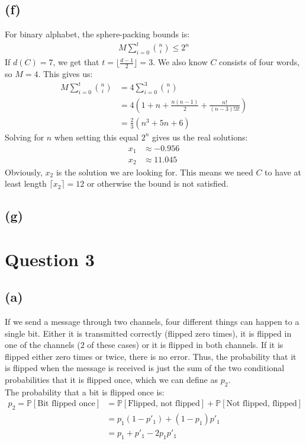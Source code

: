 \documentclass[a4paper, fleqn]{article}
\begin{document}
\subsection{(f)}
For binary alphabet, the sphere-packing bounds is:
\begin{align*}
  M\sum_{i=0}^t \binom{n}{i}\leq 2^n
\end{align*}
If $d(C)=7$, we get that $t=\lfloor \frac{d-1}{2} \rfloor = 3$. We also know $C$ consists
of four words, so $M=4$. This gives us:
\begin{align*}
  M\sum_{i=0}^t \binom{n}{i}&= 4\sum_{i=0}^3 \binom{n}{i} \\
                            &= 4\left(1+n+\frac{n(n-1)}{2}+\frac{n!}{(n-3)!3!}\right) \\
                            &= \frac{2}{3}\left(n^3+5n+6\right)
\end{align*}
Solving for $n$ when setting this equal $2^n$ gives us the real solutions:
\begin{align*}
  x_1&\approx -0.956 \\
  x_2&\approx 11.045
\end{align*}
Obviously, $x_2$ is the solution we are looking for. This means we need $C$ to have at
least length $\lceil x_2\rceil=12$ or otherwise the bound is not satisfied.

\subsection{(g)}

\section{Question 3}
\subsection{(a)}
If we send a message through two channels, four different things can happen to a single
bit. Either it is transmitted correctly (flipped zero times), it is flipped in one of the
channels ($2$ of these cases) or it is flipped in both channels. If it is flipped either
zero times or twice, there is no error. Thus, the probability that it is flipped when the
message is received is just the sum of the two conditional probabilities that it is
flipped once, which we can define as $p_2$. \\
The probability that a bit is flipped once is:
\begin{align*}
  p_2 =\mathbb{P}[\mbox{Bit flipped once}] &=
  \mathbb{P}[\mbox{Flipped, not flipped}]+\mathbb{P}[\mbox{Not flipped, flipped}] \\
  &= p_1(1-p'_1)+(1-p_1)p'_1 \\
  &= p_1+p'_1-2p_1p'_1
\end{align*}
\end{document}
